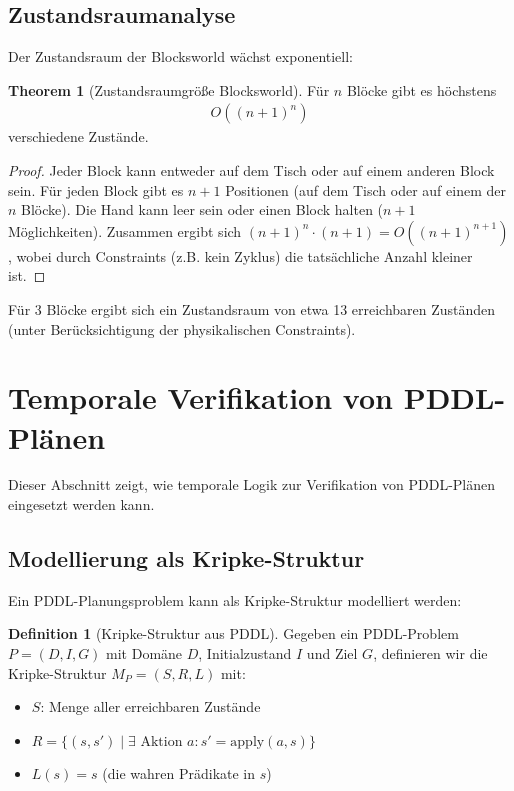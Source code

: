 ﻿\documentclass[a4paper,12pt]{article}
\theoremstyle{definition}
\newtheorem{definition}{Definition}[section]
\newtheorem{theorem}{Theorem}[section]
\begin{document}
\subsection{Zustandsraumanalyse}

Der Zustandsraum der Blocksworld wächst exponentiell:

\begin{theorem}[Zustandsraumgröße Blocksworld]
	Für $n$ Blöcke gibt es höchstens
	\begin{align}
	O((n+1)^n)
	\end{align}
	verschiedene Zustände.
\end{theorem}

\begin{proof}
	Jeder Block kann entweder auf dem Tisch oder auf einem anderen Block sein. Für jeden Block gibt es $n+1$ Positionen (auf dem Tisch oder auf einem der $n$ Blöcke). Die Hand kann leer sein oder einen Block halten ($n+1$ Möglichkeiten). Zusammen ergibt sich $(n+1)^n \cdot (n+1) = O((n+1)^{n+1})$, wobei durch Constraints (z.B. kein Zyklus) die tatsächliche Anzahl kleiner ist.
\end{proof}

Für 3 Blöcke ergibt sich ein Zustandsraum von etwa 13 erreichbaren Zuständen (unter Berücksichtigung der physikalischen Constraints).

\section{Temporale Verifikation von PDDL-Plänen}

Dieser Abschnitt zeigt, wie temporale Logik zur Verifikation von PDDL-Plänen eingesetzt werden kann.

\subsection{Modellierung als Kripke-Struktur}

Ein PDDL-Planungsproblem kann als Kripke-Struktur modelliert werden:

\begin{definition}[Kripke-Struktur aus PDDL]
	Gegeben ein PDDL-Problem $P = (D, I, G)$ mit Domäne $D$, Initialzustand $I$ und Ziel $G$, definieren wir die Kripke-Struktur $M_P = (S, R, L)$ mit:
	\begin{itemize}
		\item[-] $S$: Menge aller erreichbaren Zustände
		\item[-] $R = \{(s, s') \mid \exists \text{ Aktion } a: s' = \text{apply}(a, s)\}$
		\item[-] $L(s) = s$ (die wahren Prädikate in $s$)
	\end{itemize}
\end{definition}
\end{document}

